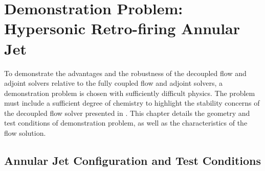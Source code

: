 \chapter{Demonstration Problem: Hypersonic Retro-firing Annular Jet}
\label{chapter-five}

To demonstrate the advantages and the robustness of the decoupled flow and
adjoint solvers relative to the fully coupled flow and adjoint solvers, a
demonstration problem is chosen with sufficiently difficult physics.  The
problem must include a sufficient degree of chemistry to highlight the stability
concerns of the decoupled flow solver presented in
.  This chapter details the geometry and test
conditions of demonstration problem, as well as the characteristics of the flow
solution.

\section{Annular Jet Configuration and Test Conditions}


